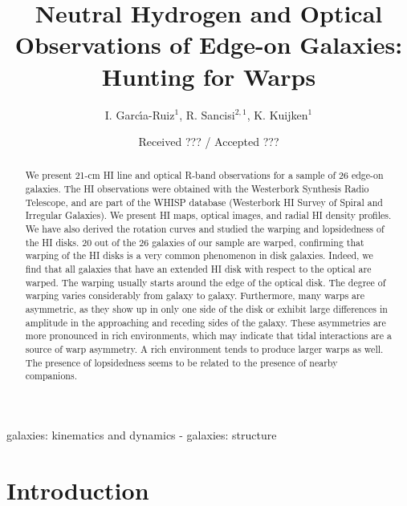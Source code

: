 \documentclass{aa}
\begin{document}
\title{Neutral Hydrogen and Optical Observations of Edge-on Galaxies:
  Hunting for Warps}

\author{I. Garc\'{\i}a-Ruiz$^1$, R. Sancisi$^{2,1}$, K. Kuijken$^1$}
\date{Received ??? / Accepted ???}
\maketitle

\begin{abstract}
We present 21-cm HI line and optical R-band observations for a sample
of 26 edge-on galaxies. The HI observations were obtained with the
Westerbork Synthesis Radio Telescope, and are part of the WHISP
database (Westerbork HI Survey of Spiral and Irregular Galaxies). We
present HI maps, optical images, and radial HI density profiles. We have also
derived the rotation curves and studied the warping and lopsidedness
of the HI disks. 20 out of the 26 galaxies of our sample are warped, confirming that
warping of the HI disks is a very common phenomenon in disk
galaxies. Indeed, we find that all galaxies that have an extended HI disk with
respect to the optical are warped. The warping usually starts around the
edge of the optical disk. The degree of warping varies considerably
from galaxy to galaxy. Furthermore, many warps are asymmetric, as they 
show up in only one side of the disk or exhibit large
differences in amplitude in the approaching and receding sides of the
galaxy. These asymmetries are more pronounced in rich environments, which may
indicate that tidal interactions are a source of warp asymmetry. A
rich environment tends to produce larger warps as well. 
The presence of lopsidedness seems to be related to the
presence of nearby companions. 

\end{abstract}

\begin{keywords}
galaxies: kinematics and dynamics - galaxies: structure
\end{keywords}

\section{Introduction}
\end{document}
